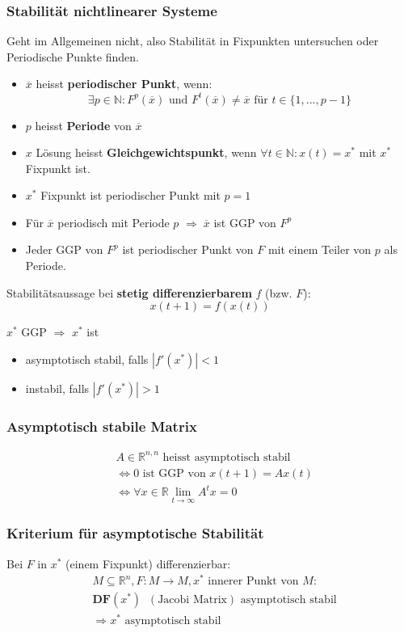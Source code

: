 \documentclass[a4paper]{article}
\newcommand{\R}{\mathbb{R}}
\begin{document}
\subsubsection{Stabilität nichtlinearer Systeme}
Geht im Allgemeinen nicht, also
Stabilität in Fixpunkten untersuchen oder
Periodische Punkte finden.

\begin{itemize}
	\item $\overline{x}$ heisst \textbf{periodischer Punkt}, wenn:
		\[
		\exists p \in \mathbb{N}:
		F ^{p} (\overline{x})
		\text{ und }
		F ^{t} (\overline{x}) \neq \overline{x}
		\text{ für } t \in \{
			1, ..., p-1
		\} 
		\] 
	\item $p$ heisst \textbf{Periode}  von $\overline{x}$
	\item $x$ Lösung heisst \textbf{Gleichgewichtspunkt}, wenn
		$\forall t \in \mathbb{N}: x(t) = x ^{*}$
		mit $x ^{*}$ Fixpunkt ist.
	\item $x ^{*}$ Fixpunkt ist periodischer Punkt mit $p = 1$
	\item Für $\overline{x}$ periodisch mit Periode $p$
		$\Rightarrow \; \overline{x}$ ist GGP von $F ^{p}$
	\item Jeder GGP von $F ^{p}$ ist periodischer Punkt von $F$ mit
		einem Teiler von $p$ als Periode.
\end{itemize}

Stabilitätsaussage bei \textbf{stetig differenzierbarem} $f$ (bzw. $F$):
\[
	x(t+1) = f(x(t))
\] 

$x ^{*}$ GGP $\Rightarrow$ $x ^{*}$ ist
\begin{itemize}
	\item asymptotisch stabil, falls $| f' (x ^{*}) | < 1$
	\item instabil, falls $| f'(x ^{*}) | > 1$
\end{itemize}

\subsubsection{Asymptotisch stabile Matrix}
\begin{align*}
	& A \in \R ^{n, n} \text{ heisst asymptotisch stabil } \\
	&\Leftrightarrow 0 \text{ ist GGP von } x(t+1) = A x(t) \\
	&\Leftrightarrow \forall x \in \R \lim_{t \to \infty} A ^{t} x = 0
\end{align*}

\subsubsection{Kriterium für asymptotische Stabilität}
Bei $F$ in $x ^{*}$ (einem Fixpunkt) differenzierbar:
\begin{align*}
	& M \subseteq \R ^{n}, F: M \rightarrow M,
	x ^{*} \text{ innerer Punkt von } M: \\
	& \textbf{DF} (x ^{*}) \;\; (\text{Jacobi Matrix}) \text{ asymptotisch stabil} \\
	&\Rightarrow x ^{*} \text{ asymptotisch stabil}
\end{align*}
\end{document}

